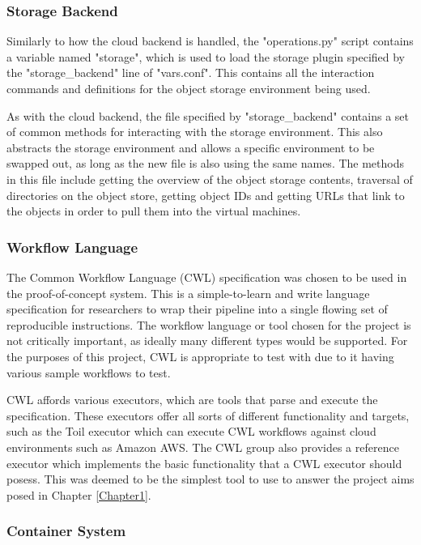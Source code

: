 \subsubsection{Storage Backend}

Similarly to how the cloud backend is handled, the "operations.py" script contains a variable named "storage", which is used to load the storage plugin specified by the "storage\_backend" line of "vars.conf". This contains all the interaction commands and definitions for the object storage environment being used.

As with the cloud backend, the file specified by "storage\_backend" contains a set of common methods for interacting with the storage environment. This also abstracts the storage environment and allows a specific environment to be swapped out, as long as the new file is also using the same names. The methods in this file include getting the overview of the object storage contents, traversal of directories on the object store, getting object IDs and getting URLs that link to the objects in order to pull them into the virtual machines.

\subsubsection{Workflow Language}

The Common Workflow Language (CWL) specification was chosen to be used in the proof-of-concept system. This is a simple-to-learn and write language specification for researchers to wrap their pipeline into a single flowing set of reproducible instructions. The workflow language or tool chosen for the project is not critically important, as ideally many different types would be supported. For the purposes of this project, CWL is appropriate to test with due to it having various sample workflows to test.

CWL affords various executors, which are tools that parse and execute the specification. These executors offer all sorts of different functionality and targets, such as the Toil executor which can execute CWL workflows against cloud environments such as Amazon AWS. The CWL group also provides a reference executor which implements the basic functionality that a CWL executor should posess. This was deemed to be the simplest tool to use to answer the project aims posed in Chapter \ref{Chapter1}.

\subsubsection{Container System}

